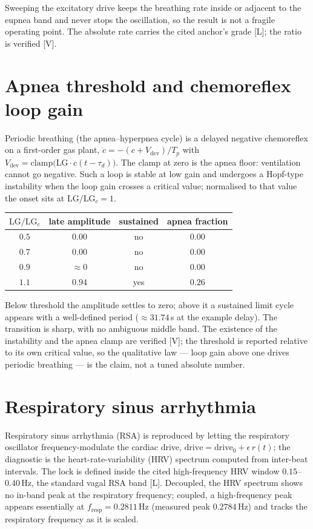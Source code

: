 \documentclass[11pt]{article}
\newcommand{\grade}[1]{\textsf{\small[#1]}}
\begin{document}
\noindent
Sweeping the excitatory drive keeps the breathing rate inside or adjacent to the eupnea band and never
stops the oscillation, so the result is not a fragile operating point. The absolute rate carries the
cited anchor's grade \grade{L}; the ratio is verified \grade{V}.

\section{Apnea threshold and chemoreflex loop gain}

Periodic breathing (the apnea--hyperpnea cycle) is a delayed negative chemoreflex on a first-order gas
plant, $\dot c=-(c+V_{\mathrm{dev}})/T_p$ with $V_{\mathrm{dev}}=\mathrm{clamp}\!\big(\mathrm{LG}\cdot
c(t-\tau_d)\big)$. The clamp at zero is the apnea floor: ventilation cannot go negative. Such a loop is
stable at low gain and undergoes a Hopf-type instability when the loop gain crosses a critical value;
normalised to that value the onset sits at $\mathrm{LG}/\mathrm{LG}_c=1$.

\begin{center}
\begin{tabular}{@{}cccc@{}}
\toprule
$\mathrm{LG}/\mathrm{LG}_c$ & late amplitude & sustained & apnea fraction\\
\midrule
$0.5$ & $0.00$ & no & $0.00$\\
$0.7$ & $0.00$ & no & $0.00$\\
$0.9$ & $\approx 0$ & no & $0.00$\\
$1.1$ & $0.94$ & yes & $0.26$\\
\bottomrule
\end{tabular}
\end{center}

\noindent
Below threshold the amplitude settles to zero; above it a sustained limit cycle appears with a
well-defined period ($\approx 31.74\,$s at the example delay). The transition is sharp, with no
ambiguous middle band. The existence of the instability and the apnea clamp are verified \grade{V}; the
threshold is reported relative to its own critical value, so the qualitative law --- loop gain above
one drives periodic breathing --- is the claim, not a tuned absolute number.

\section{Respiratory sinus arrhythmia}

Respiratory sinus arrhythmia (RSA) is reproduced by letting the respiratory oscillator
frequency-modulate the cardiac drive, $\text{drive}=\text{drive}_0+\epsilon\,r(t)$; the diagnostic is
the heart-rate-variability (HRV) spectrum computed from inter-beat intervals. The lock is defined
inside the cited high-frequency HRV window $0.15$--$0.40\,$Hz, the standard vagal RSA band \grade{L}.
Decoupled, the HRV spectrum shows no in-band peak at the respiratory frequency; coupled, a
high-frequency peak appears essentially at $f_{\mathrm{resp}}=0.2811\,$Hz (measured peak
$0.2784\,$Hz) and tracks the respiratory frequency as it is scaled.
\end{document}
